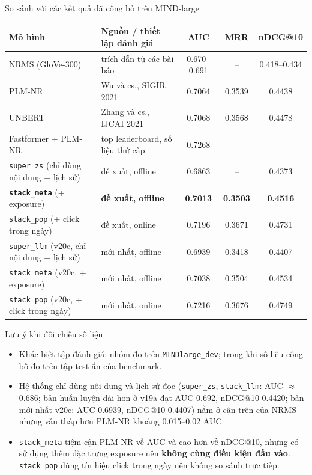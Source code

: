 \documentclass[aspectratio=169,t]{beamer}
\newcommand{\code}[1]{\texttt{#1}}
\begin{document}
\begin{frame}[shrink]{So sánh với các kết quả đã công bố trên MIND-large}
\scriptsize
\renewcommand{\arraystretch}{1.16}
\begin{tabularx}{\textwidth}{@{}lYccc@{}}
\toprule
\textbf{Mô hình} & \textbf{Nguồn / thiết lập đánh giá} & \textbf{AUC} & \textbf{MRR} & \textbf{nDCG@10}\\
\midrule
NRMS (GloVe-300) & trích dẫn từ các bài báo & 0.670--0.691 & -- & 0.418--0.434\\
PLM-NR & Wu và cs., SIGIR 2021 & 0.7064 & 0.3539 & 0.4438\\
UNBERT & Zhang và cs., IJCAI 2021 & 0.7068 & 0.3568 & 0.4478\\
Fastformer + PLM-NR & top leaderboard, số liệu thứ cấp & 0.7268 & -- & --\\
\midrule
\code{super\_zs} (chỉ dùng nội dung + lịch sử) & đề xuất, offline & 0.6863 & -- & 0.4373\\
\textbf{\code{stack\_meta}} (+ exposure) & \textbf{đề xuất, offline} & \textbf{0.7013} & \textbf{0.3503} & \textbf{0.4516}\\
\code{stack\_pop} (+ click trong ngày) & đề xuất, online & 0.7196 & 0.3671 & 0.4731\\
\midrule
\code{super\_llm} (v20c, chỉ nội dung + lịch sử) & mới nhất, offline & 0.6939 & 0.3418 & 0.4407\\
\code{stack\_meta} (v20c, + exposure) & mới nhất, offline & 0.7038 & 0.3504 & 0.4534\\
\code{stack\_pop} (v20c, + click trong ngày) & mới nhất, online & 0.7216 & 0.3676 & 0.4749\\
\bottomrule
\end{tabularx}
\begin{alertblock}{Lưu ý khi đối chiếu số liệu}
\scriptsize
\begin{itemize}
  \setlength{\itemsep}{1pt}
  \item Khác biệt tập đánh giá: nhóm đo trên \code{MINDlarge\_dev}; trong khi số liệu công bố đo trên tập test ẩn của benchmark.
  \item Hệ thống chỉ dùng nội dung và lịch sử đọc (\code{super\_zs}, \code{stack\_llm}: AUC $\approx$ 0.686; bản huấn luyện dài hơn ở v19a đạt AUC 0.692, nDCG@10 0.4420; bản mới nhất v20c: AUC 0.6939, nDCG@10 0.4407) nằm ở cận trên của NRMS nhưng vẫn thấp hơn PLM-NR khoảng 0.015--0.02 AUC.
  \item \code{stack\_meta} tiệm cận PLM-NR về AUC và cao hơn về nDCG@10, nhưng có sử dụng thêm đặc trưng exposure nên \textbf{không cùng điều kiện đầu vào}. \code{stack\_pop} dùng tín hiệu click trong ngày nên không so sánh trực tiếp.
\end{itemize}
\end{alertblock}
\par\kern0pt%
\end{frame}
\end{document}
